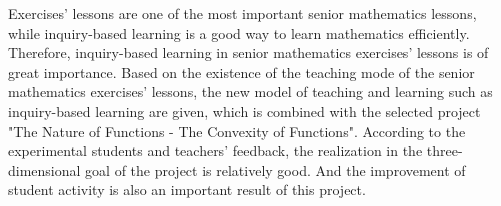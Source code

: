 \documentclass{CCNUthesis}
\begin{document}



\frontmatter


\tableofcontents


\begin{abstract}
  习题课是不可或缺的高中数学课型之一，探究性学习是高效学习的良好方法，因此高中数学习题课中的探究性学习具有极大重要性。本文根据数学习题课的教学模式的存在问题，为习题课提供新的教学与学习方法即探究性学习，结合选定的课题《函数的性质——函数的凹凸性》设计探究性教学方案，由实验学生与教师的反馈得出该案例教学三维目标的实现较为良好，且学生主动性和课堂积极性的提升是该实例的重要成效。
\end{abstract}

\begin{abstract*}
  Exercises’ lessons are one of the most important senior mathematics lessons, while inquiry-based learning is a good way to learn mathematics efficiently. Therefore, inquiry-based learning in senior mathematics exercises’ lessons is of great importance. Based on the existence of the teaching mode of the senior mathematics exercises’ lessons, the new model of teaching and learning such as inquiry-based learning are given, which is combined with the selected project "The Nature of Functions - The Convexity of Functions". According to the experimental students and teachers’ feedback, the realization in the three-dimensional goal of the project is relatively good. And the improvement of student activity is also an important result of this project.
\end{abstract*}


\end{document}
